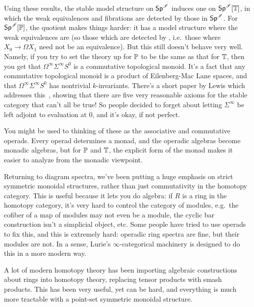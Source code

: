 Using these results, the stable model structure on $\Spc^\sI$ induces one on
$\Spc^\sI[\T]$, in which the weak equivalences and fibrations are detected
by those in $\Spc^\sI$. For $\Spc^\sI[\P]$, the quotient makes things harder: it has a model structure where the
weak equivalences are  (so those which are detected by , i.e.\ those where $X_0\to\Omega X_1$ need not be an equivalence). But this still doesn't behave
very well. Namely, if you try to set the theory up for $\P$ to be the same as that for $\T$, then you get that
$\Omega^\infty\Sigma^\infty S^0$ is a commutative topological monoid. It's a fact that any commutative topological
monoid is a product of Eilenberg-Mac Lane spaces, and that $\Omega^\infty\Sigma^\infty S^0$ has nontrivial
$k$-invariants. There's a short paper by Lewis which addresses this~\cite{Lewis91}, showing that there are five
very reasonable axioms for the stable category that can't all be true! So people decided to forget about letting
$\Sigma^\infty$ be left adjoint to evaluation at $0$, and it's okay, if not perfect.
\begin{rem}
You might be used to thinking of these as the associative and commutative operads. Every operad determines a monad,
and the operadic algebras become monadic algebras, but for $\P$ and $\T$, the explicit form of the monad makes it
easier to analyze from the monadic viewpoint.
\end{rem}
Returning to diagram spectra, we've been putting a huge emphasis on strict symmetric monoidal structures, rather
than just commutativity in the homotopy category. This is useful because it lets you do algebra: if $R$ is a ring
in the homotopy category, it's very hard to control the category of modules, e.g.\ the cofiber of a map of modules
may not even be a module, the cyclic bar construction isn't a simplicial object, etc. Some people have tried to use
operads to fix this, and this is extremely hard: operadic ring spectra are fine, but their modules are not. In a
sense, Lurie's $\infty$-categorical machinery is designed to do this in a more modern way.

A lot of modern homotopy theory has been importing algebraic constructions about rings into homotopy theory,
replacing tensor products with smash products. This has been very useful, yet can be hard, and everything is much
more tractable with a point-set symmetric monoidal structure.
